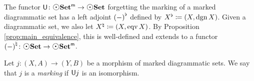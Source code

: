 \begin{dfn}
    The functor \( \fun{U} \colon \mdgmSet \to \dgmSet \) forgetting the marking of a marked diagrammatic set has a left adjoint \( {(-)}^{\flat} \) defined by \( {X}^{\flat} \coloneqq (X, \operatorname{dgn} X) \).
    Given a diagrammatic set, we also let \( {X}^{\natural} \coloneqq (X, \operatorname{eqv} X) \).
    By Proposition \ref{prop:main_equivalence}, this is well-defined and extends to a functor \( \natmark{(-)} \colon \dgmSet \to \mdgmSet \). 
\end{dfn}

\begin{dfn} [Marking]
   Let \( j \colon (X, A) \to (Y, B) \) be a morphism of marked diagrammatic sets. 
   We say that \( j \) is a \emph{marking} if \( \mathsf{U}j \) is an isomorphism.
\end{dfn}

